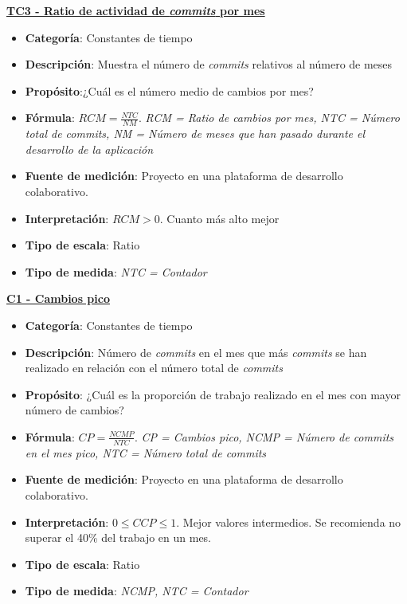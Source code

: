 \textbf{\underline{TC3 - Ratio de actividad de \textit{commits} por mes}}

\begin{itemize}
	\item \textbf{Categoría}: Constantes de tiempo
	\item \textbf{Descripción}: Muestra el número de \textit{commits} relativos al número de meses
	\item \textbf{Propósito}:¿Cuál es el número medio de cambios por mes?
	\item \textbf{Fórmula}: $RCM = \frac{NTC}{NM}$. \textit{RCM = Ratio de cambios por mes, NTC = Número total de \textit{commits}, NM = Número de meses que han pasado durante el desarrollo de la aplicación}
	\item \textbf{Fuente de medición}: Proyecto en una plataforma de desarrollo colaborativo.
	\item \textbf{Interpretación}: $RCM > 0$. Cuanto más alto mejor
	\item \textbf{Tipo de escala}: Ratio
	\item \textbf{Tipo de medida}: \textit{NTC = Contador}
\end{itemize}

\textbf{\underline{C1 - Cambios pico}}

\begin{itemize}
	\item \textbf{Categoría}: Constantes de tiempo
	\item \textbf{Descripción}: Número de \textit{commits} en el mes que más \textit{commits} se han realizado en relación con el número total de \textit{commits}
	\item \textbf{Propósito}: ¿Cuál es la proporción de trabajo realizado en el mes con mayor número de cambios?
	\item \textbf{Fórmula}: $CP = \frac{NCMP}{NTC}$. \textit{CP = Cambios pico, NCMP = Número de \textit{commits} en el mes pico, NTC = Número total de \textit{commits}}
	\item \textbf{Fuente de medición}: Proyecto en una plataforma de desarrollo colaborativo.
	\item \textbf{Interpretación}: $0 \leq CCP \leq 1$. Mejor valores intermedios. Se recomienda no superar el 40\% del trabajo en un mes.
	\item \textbf{Tipo de escala}: Ratio
	\item \textbf{Tipo de medida}: \textit{NCMP, NTC = Contador}
\end{itemize}

